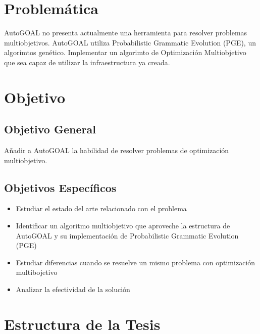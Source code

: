 \section*{Problem\'atica}
AutoGOAL no presenta actualmente una herramienta para resolver problemas multiobjetivos. AutoGOAL utiliza Probabilistic Grammatic Evolution (PGE), un algorimtos gen\'etico. Implementar un algorimto de Optimizaci\'on Multiobjetivo que sea capaz de utilizar la infraestructura ya creada.


\section*{Objetivo}
\subsection*{Objetivo General}
Añadir a AutoGOAL la habilidad de resolver problemas de optimizaci\'on multiobjetivo.
\subsection*{Objetivos Espec\'ificos}
\begin{itemize}
    \item Estudiar el estado del arte relacionado con el problema
    \item Identificar un algoritmo multiobjetivo que aproveche la estructura de AutoGOAL y su implementaci\'on de Probabilistic Grammatic Evolution (PGE)
    \item Estudiar diferencias cuando se resuelve un mismo problema con optimizaci\'on multibojetivo
    \item Analizar la efectividad de la soluci\'on
\end{itemize}

\section*{Estructura de la Tesis}
